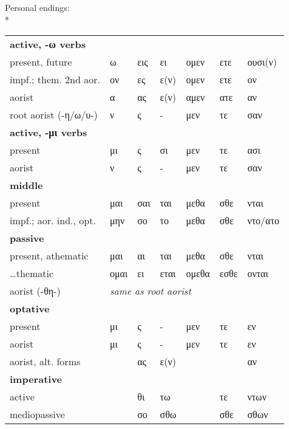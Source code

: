 Personal endings:\\*
%
\begin{tabular}{lllllll}
\textbf{active, -ω verbs}\\
present, future              & ω      & εις     & ει        & ομεν    & ετε    & ουσι(ν) \\
impf.; them. 2nd aor.        & ον     & ες      & ε(ν)      & ομεν    &	ετε    & ον \\
aorist                       & α      & ας      & ε(ν)      & αμεν    & ατε    & αν \\
root aorist (-η/ω/υ-)        & ν      & ς       & -         & μεν     & τε     & σαν \\
\textbf{active, -μι verbs}\\
present                      & μι     & ς       & σι        & μεν     & τε     & ασι \\
aorist                       & ν      & ς       & -         & μεν     & τε     & σαν \\
\textbf{middle}\\
present                      & μαι    & σαι     & ται       & μεθα    & σθε    & νται \\
impf.; aor. ind., opt.       & μην    & σο      & το        & μεθα    &	σθε    & ντο/ατο\\
\textbf{passive}\\
present, athematic           & μαι    & αι      & ται       & μεθα    & σθε    & νται \\
\ldots thematic              & ομαι   & ει      & εται      & ομεθα   & εσθε   & ονται \\
aorist (-θη-)                & \multicolumn{6}{l}{\emph{same as root aorist}}\\
\textbf{optative}\\
present                      & μι     & ς       & -         & μεν     & τε     & εν \\
aorist                       & μι     & ς       & -         & μεν     & τε     & εν \\
aorist, alt. forms           &        & ας      & ε(ν)      &         &        & αν \\
\textbf{imperative}\\
active                       &        & θι\footnotemark    & τω        &         & τε     & ντων \\
mediopassive                 &        & σο      & σθω       &         & σθε    & σθων \\
\end{tabular}



\pagebreak

